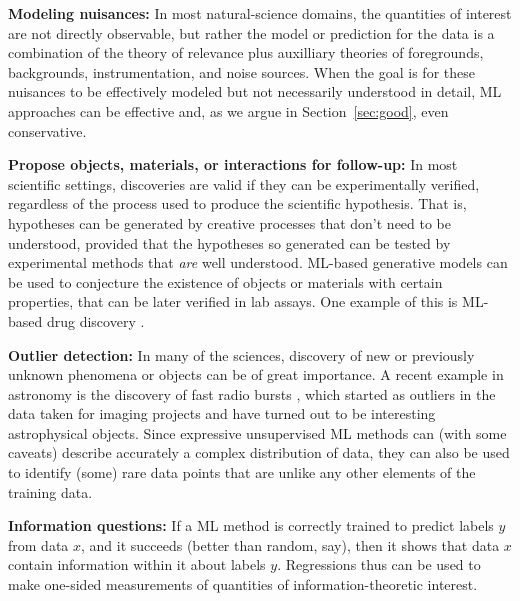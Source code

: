 \documentclass{article}
\renewcommand{\paragraph}[1]{\noindent\par\textbf{#1}}
\newcommand{\sectionname}{Section}
\newcommand{\secref}[1]{\sectionname~\ref{#1}}
\begin{document}
\paragraph{Modeling nuisances:}
In most natural-science domains, the quantities of interest are not directly observable, but rather the model or prediction for the data is a combination of the theory of relevance plus auxilliary theories of foregrounds, backgrounds, instrumentation, and noise sources.
When the goal is for these nuisances to be effectively modeled but not necessarily understood in detail, ML approaches can be effective and, as we argue in \secref{sec:good}, even conservative.

\paragraph{Propose objects, materials, or interactions for follow-up:}
In most scientific settings, discoveries are valid if they can be experimentally verified, regardless of the process used to produce the scientific hypothesis.
That is, hypotheses can be generated by creative processes that don't need to be understood, provided that the hypotheses so generated can be tested by experimental methods that \emph{are} well understood.
ML-based generative models can be used to conjecture the existence of objects or materials with certain properties, that can be later verified in lab assays.
One example of this is ML-based drug discovery \cite{kang2018conditional}. 

\paragraph{Outlier detection:}
In many of the sciences, discovery of new or previously unknown phenomena or objects can be of great importance.
A recent example in astronomy is the discovery of fast radio bursts \cite{frbs}, which started as outliers in the data taken for imaging projects and have turned out to be interesting astrophysical objects.
Since expressive unsupervised ML methods can (with some caveats) describe accurately a complex distribution of data, they can also be used to identify (some) rare data points that are unlike any other elements of the training data.

\paragraph{Information questions:}
If a ML method is correctly trained to predict labels $y$ from data $x$, and it succeeds (better than random, say), then it shows that data $x$ contain information within it about labels $y$.
Regressions thus can be used to make one-sided measurements of quantities of information-theoretic interest.
\end{document}

